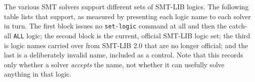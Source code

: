 \documentclass[12pt,oneside]{report}
\begin{document}
The various SMT solvers support different sets of SMT-LIB logics.  The following table lists that support, as measured by presenting each logic name to each solver in turn.
The first block issues no \texttt{set-logic} command at all and then the catch-all \texttt{ALL} logic; the second block is the current, official SMT-LIB logic set; the third is logic names carried over from SMT-LIB 2.0 that are no longer official; and the last is a deliberately invalid name, included as a control.
Note that this records only whether a solver \emph{accepts} the name, not whether it can usefully solve anything in that logic.



\end{document}
